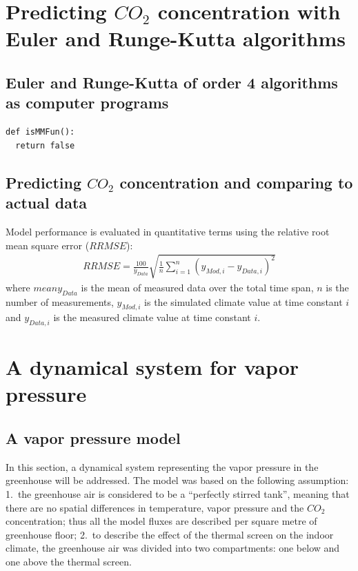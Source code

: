 \documentclass[a4paper]{article}
\newcommand*\mean[1]{\bar{#1}}
\begin{document}
\newpage
\section{Predicting \(CO_2\) concentration with Euler and Runge-Kutta algorithms}
\subsection{Euler and Runge-Kutta of order 4 algorithms as computer programs}
\begin{mdframed}[leftline=false,rightline=false,backgroundcolor=magenta!10]
  \begin{verbatim}
def isMMFun():
  return false
  \end{verbatim}
\end{mdframed}

\subsection{Predicting \(CO_2\) concentration and comparing to actual data}

Model performance is evaluated in quantitative terms using the relative root mean square error (\(RRMSE\))\cite{kobayashi2000comparing}:
\begin{align}
  RRMSE = \frac{100}{\mean{y}_{Data}} \sqrt{\frac{1}{n} \sum_{i=1}^{n} {\left(y_{Mod,i} - y_{Data,i}\right)}^2}
\end{align}
where \(mean{y}_{Data}\) is the mean of measured data over the total time span, \(n\) is the number of measurements, \(y_{Mod,i}\) is the simulated climate value at time constant \(i\) and \(y_{Data,i}\) is the measured climate value at time constant \(i\).



\newpage
\section{A dynamical system for vapor pressure}
\subsection{A vapor pressure model}
In this section, a dynamical system representing the vapor pressure in the greenhouse will be addressed.
The model was based on the following assumption:
1.\ the greenhouse air is considered to be a ``perfectly stirred tank'', meaning that there are no spatial differences in temperature, vapor pressure and the \(CO_2\) concentration; thus all the model fluxes are described per square metre of greenhouse floor;
2.\ to describe the effect of the thermal screen on the indoor climate, the greenhouse air was divided into two compartments: one below and one above the thermal screen.
\end{document}
